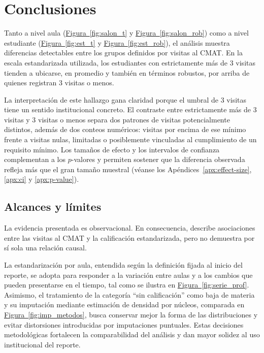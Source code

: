 \documentclass[10pt,letterpaper]{article} %
\numberwithin{figure}{subsection}
\let\oldsection\section
\renewcommand{\section}{\clearpage\oldsection}
\begin{document}
\FloatBarrier
\newpage
\section{Conclusiones}

Tanto a nivel aula (\hyperref[fig:salon_t]{Figura~\ref{fig:salon_t}} y \hyperref[fig:salon_rob]{Figura~\ref{fig:salon_rob}}) como a nivel estudiante (\hyperref[fig:est_t]{Figura~\ref{fig:est_t}} y \hyperref[fig:est_rob]{Figura~\ref{fig:est_rob}}), el análisis muestra diferencias detectables entre los grupos definidos por visitas al CMAT. En la escala estandarizada utilizada, los estudiantes con estrictamente más de 3 visitas tienden a ubicarse, en promedio y también en términos robustos, por arriba de quienes registran 3 visitas o menos.

La interpretación de este hallazgo gana claridad porque el umbral de 3 visitas tiene un sentido institucional concreto. El contraste entre estrictamente más de 3 visitas y 3 visitas o menos separa dos patrones de visitas potencialmente distintos, además de dos conteos numéricos: visitas por encima de ese mínimo frente a visitas nulas, limitadas o posiblemente vinculadas al cumplimiento de un requisito mínimo. Los tamaños de efecto y los intervalos de confianza complementan a los $p$-valores y permiten sostener que la diferencia observada refleja más que el gran tamaño muestral (véanse los Apéndices~\ref{apx:effect-size}, \ref{apx:ci} y \ref{apx:p-value}).

\subsection{Alcances y límites}
La evidencia presentada es observacional. En consecuencia, describe asociaciones entre las visitas al CMAT y la calificación estandarizada, pero no demuestra por sí sola una relación causal. 

La estandarización por aula, entendida según la definición fijada al inicio del reporte, se adopta para responder a la variación entre aulas y a los cambios que pueden presentarse en el tiempo, tal como se ilustra en \hyperref[fig:serie_prof]{Figura~\ref{fig:serie_prof}}. Asimismo, el tratamiento de la categoría ``sin calificación'' como baja de materia y su imputación mediante estimación de densidad por núcleos, comparada en \hyperref[fig:imp_metodos]{Figura~\ref{fig:imp_metodos}}, busca conservar mejor la forma de las distribuciones y evitar distorsiones introducidas por imputaciones puntuales. Estas decisiones metodológicas fortalecen la comparabilidad del análisis y dan mayor solidez al uso institucional del reporte.
\end{document}
